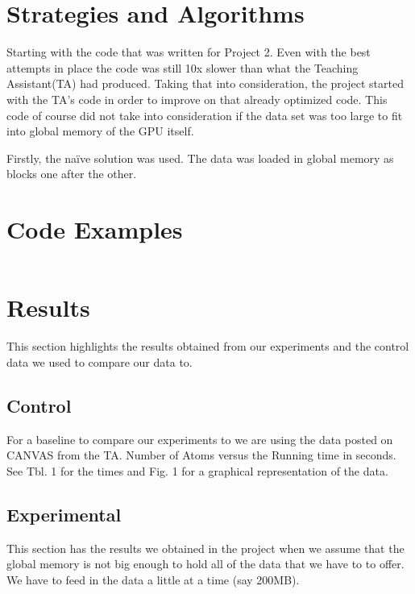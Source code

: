\documentclass[twocolumn]{article}
\begin{document}
 
\section{Strategies and Algorithms}
Starting with the code that was written for Project 2. Even with the best attempts in place the code was still 10x slower than what the Teaching Assistant(TA) had produced. Taking that into consideration, the project started with the TA's code in order to improve on that already optimized code. This code of course did not take into consideration if the data set was too large to fit into global memory of the GPU itself. 
\par Firstly, the na{\"i}ve solution was used. The data was loaded in global memory as blocks one after the other. 


\section{Code Examples}
\lipsum[1-3]
\begin{lstlisting}
\end{lstlisting}



\section{Results}
This section highlights the results obtained from our experiments and the control data we used to compare our data to.
\par \lipsum[1-2]

\subsection{Control}
For a baseline  to compare our experiments to we are using the data posted on CANVAS from the TA. Number of Atoms versus the Running time in seconds. See Tbl. 1 for the times and Fig. 1 for a graphical representation of the data.


\subsection{Experimental}
This section has the results we obtained in the project when we assume that the global memory is not big enough to hold all of the data that we have to to offer. We have to feed in the data a little at a time (say 200MB).
\end{document}
